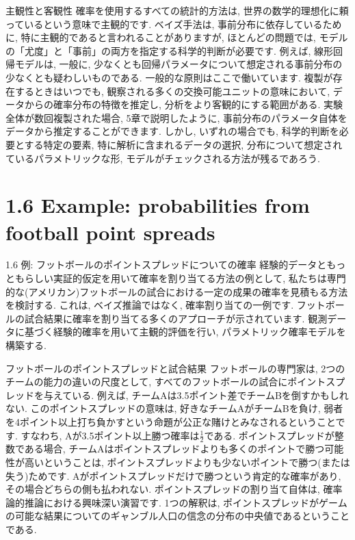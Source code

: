 \documentclass[10pt,dvipdfmx,a4]{beamer}
\begin{document}

\begin{frame}{主観性と客観性}
確率を使用するすべての統計的方法は, 世界の数学的理想化に頼っているという意味で主観的です.
ベイズ手法は, 事前分布に依存しているために, 特に主観的であると言われることがありますが, ほとんどの問題では, モデルの「尤度」と「事前」の両方を指定する科学的判断が必要です.
例えば, 線形回帰モデルは, 一般に, 少なくとも回帰パラメータについて想定される事前分布の少なくとも疑わしいものである.
一般的な原則はここで働いています.
複製が存在するときはいつでも, 観察される多くの交換可能ユニットの意味において, データからの確率分布の特徴を推定し, 分析をより客観的にする範囲がある.
実験全体が数回複製された場合, 5章で説明したように, 事前分布のパラメータ自体をデータから推定することができます.
しかし, いずれの場合でも, 科学的判断を必要とする特定の要素, 特に解析に含まれるデータの選択, 分布について想定されているパラメトリックな形, モデルがチェックされる方法が残るであろう.
\end{frame}

\section{1.6 Example: probabilities from football point spreads}
\begin{frame}{1.6 例: フットボールのポイントスプレッドについての確率}
経験的データともっともらしい実証的仮定を用いて確率を割り当てる方法の例として, 私たちは専門的な(アメリカン)フットボールの試合における一定の成果の確率を見積もる方法を検討する.
これは, ベイズ推論ではなく, 確率割り当ての一例です.
フットボールの試合結果に確率を割り当てる多くのアプローチが示されています.
観測データに基づく経験的確率を用いて主観的評価を行い, パラメトリック確率モデルを構築する.
\end{frame}


\begin{frame}{フットボールのポイントスプレッドと試合結果}
フットボールの専門家は, 2つのチームの能力の違いの尺度として, すべてのフットボールの試合にポイントスプレッドを与えている.
例えば, チームAは3.5ポイント差でチームBを倒すかもしれない.
このポイントスプレッドの意味は, 好きなチームAがチームBを負け, 弱者を4ポイント以上打ち負かすという命題が公正な賭けとみなされるということです.
すなわち, Aが3.5ポイント以上勝つ確率は$\tfrac{1}{2}$である.
ポイントスプレッドが整数である場合, チームAはポイントスプレッドよりも多くのポイントで勝つ可能性が高いということは, ポイントスプレッドよりも少ないポイントで勝つ(または失う)ためです.
Aがポイントスプレッドだけで勝つという肯定的な確率があり, その場合どちらの側も払われない.
ポイントスプレッドの割り当て自体は, 確率論的推論における興味深い演習です.
1つの解釈は, ポイントスプレッドがゲームの可能な結果についてのギャンブル人口の信念の分布の中央値であるということである.
\end{frame}
\end{document}
